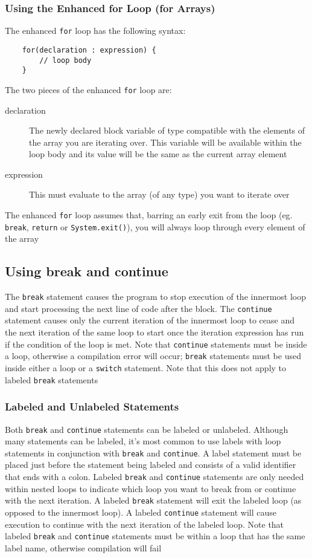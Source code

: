 \subsubsection{Using the Enhanced for Loop (for Arrays)}
The enhanced \verb#for# loop has the following syntax:
\begin{verbatim}
    for(declaration : expression) {
        // loop body
    }
\end{verbatim}
The two pieces of the enhanced \verb#for# loop are:
\begin{description}
    \item[declaration] The newly declared block variable of type compatible 
    with the elements of the array you are iterating over. This variable will 
    be available within the loop body and its value will be the same as the 
    current array element
    \item[expression] This must evaluate to the array (of any type) you want to 
    iterate over
\end{description}
The enhanced \verb#for# loop assumes that, barring an early exit from the loop 
(eg. \verb#break#, \verb#return# or \verb#System.exit()#), you will always loop 
through every element of the array

\subsection{Using break and continue}
The \verb#break# statement causes the program to stop execution of the 
innermost loop and start processing the next line of code after the block. The 
\verb#continue# statement causes only the current iteration of the innermost 
loop to cease and the next iteration of the same loop to start once the 
iteration expression has run if the condition of the loop is met. Note that 
\verb#continue# statements must be inside a loop, otherwise a compilation error 
will occur; \verb#break# statements must be used inside either a loop or a 
\verb#switch# statement. Note that this does not apply to labeled \verb#break# 
statements

\subsubsection{Labeled and Unlabeled Statements}
Both \verb#break# and \verb#continue# statements can be labeled or unlabeled.  
Although many statements can be labeled, it's most common to use labels with 
loop statements in conjunction with \verb#break# and \verb#continue#. A label 
statement must be placed just before the statement being labeled and consists 
of a valid identifier that ends with a colon. Labeled \verb#break# and 
\verb#continue# statements are only needed within nested loops to indicate 
which loop you want to break from or continue with the next iteration. A 
labeled \verb#break# statement will exit the labeled loop (as opposed to the 
innermost loop). A labeled \verb#continue# statement will cause execution to 
continue with the next iteration of the labeled loop. Note that labeled 
\verb#break# and \verb#continue# statements must be within a loop that has the 
same label name, otherwise compilation will fail

